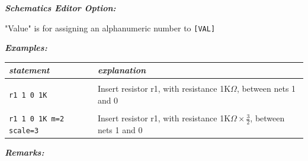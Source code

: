 \textbf{\textit{Schematics Editor Option:}}

"\textsf{Value}" is for assigning an alphanumeric number to \texttt{[VAL]}

\textbf{\textit{Examples:}}

\begin{longtable}{l l}
\textit{statement} & \textit{explanation} \\ \hline \\ \vspace{-0.8\parskip} 
\begin{minipage}{15em}\texttt{r1 1 0 1K}\end{minipage}  
& 
\begin{minipage}{15em}{\small Insert resistor r1, with resistance 1K$\Omega$, between nets 1 and 0}\end{minipage}  \\ \\ 
\begin{minipage}{15em}\texttt{r1 1 0 1K m=2 scale=3}\end{minipage}  
& 
\begin{minipage}{15em}{\small Insert resistor r1, with resistance 1K$\Omega \times \frac{3}{2}$, between nets 1 and 0}\end{minipage} 
\end{longtable}

\textbf{\textit{Remarks:}}

